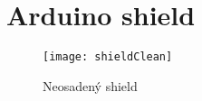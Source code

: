 \chapter{Arduino shield}
\begin{figure}[hb]
\texttt{[image: shieldClean]}
\caption{Neosadený shield}
\label{fig:neosadenyShield} 
\end{figure}
